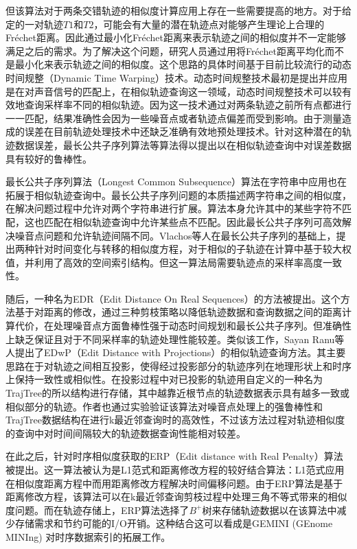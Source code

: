 但该算法对于两条交错轨迹的相似度计算应用上存在一些需要提高的地方。对于给定的一对轨迹$T1$和$T2$，可能会有大量的潜在轨迹点对能够产生理论上合理的Fr\'{e}chet距离。因此通过最小化Fr\'{e}chet距离来表示轨迹之间的相似度并不一定能够满足之后的需求。为了解决这个问题，研究人员通过用将Fr\'{e}chet距离平均化而不是最小化来表示轨迹之间的相似度。这个思路的具体时间基于目前比较流行的动态时间规整（Dynamic Time Warping）技术。动态时间规整技术最初是提出并应用是在对声音信号的匹配上\cite{rabiner1993fundamentals}，在相似轨迹查询这一领域，动态时间规整技术可以较有效地查询采样率不同的相似轨迹。因为这一技术通过对两条轨迹之前所有点都进行一一匹配，结果准确性会因为一些噪音点或者轨迹点偏差而受到影响。由于测量造成的误差在目前轨迹处理技术中还缺乏准确有效地预处理技术。针对这种潜在的轨迹数据误差，最长公共子序列算法\cite{vlachos2002discovering}等算法得以提出以在相似轨迹查询中对误差数据具有较好的鲁棒性。

最长公共子序列算法（Longest Common Subsequence）算法在字符串中应用也在拓展于相似轨迹查询中。最长公共子序列问题的本质描述两字符串之间的相似度，在解决问题过程中允许对两个字符串进行扩展。算法本身允许其中的某些字符不匹配，这也匹配在相似轨迹查询中允许某些点不匹配。因此最长公共子序列可高效解决噪音点问题和允许轨迹间隔不同。Vlachos等人在最长公共子序列的基础上，提出两种针对时间变化与转移的相似度方程\cite{vlachos2002discovering}，对于相似的子轨迹在计算中基于较大权值，并利用了高效的空间索引结构。但这一算法局需要轨迹点的采样率高度一致性。

随后，一种名为EDR\cite{chen2005robust}（Edit Distance On Real Sequences）的方法被提出。这个方法基于对距离的修改，通过三种剪枝策略以降低轨迹数据和查询数据之间的距离计算代价，在处理噪音点方面鲁棒性强于动态时间规划和最长公共子序列。但准确性上缺乏保证且对于不同采样率的轨迹处理性能较差。类似该工作，Sayan Ranu等人提出了EDwP\cite{ranu2015indexing}（Edit Distance with Projections）的相似轨迹查询方法。其主要思路在于对轨迹之间相互投影，使得经过投影部分的轨迹序列在地理形状上和时序上保持一致性或相似性。在投影过程中对已投影的轨迹用自定义的一种名为TrajTree的所以结构进行存储，其中越靠近根节点的轨迹数据表示具有越多一致或相似部分的轨迹。作者也通过实验验证该算法对噪音点处理上的强鲁棒性和TrajTree数据结构在进行k最近邻查询时的高效性，不过该方法过程对轨迹相似度的查询中对时间间隔较大的轨迹数据查询性能相对较差。



在此之后，针对时序相似度获取的ERP（Edit distance with Real Penalty）\cite{chen2004marriage}算法被提出。这一算法被认为是L1范式和距离修改方程的较好结合算法：L1范式应用在相似度距离方程中而用距离修改方程解决时间偏移问题。由于ERP算法是基于距离修改方程，该算法可以在k最近邻查询剪枝过程中处理三角不等式带来的相似度问题。而在轨迹存储上，ERP算法选择了$B^{+}$树来存储轨迹数据以在该算法中减少存储需求和节约可能的I/O开销。这种结合这可以看成是GEMINI (GEnome MINIng) 对时序数据索引的拓展工作。

